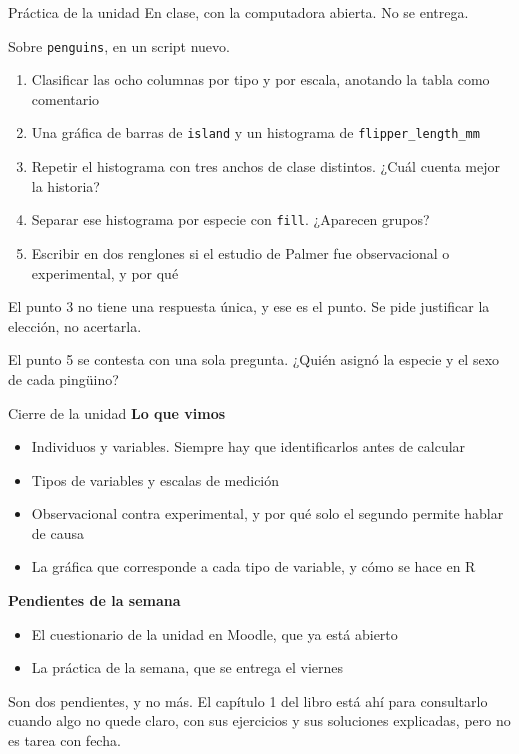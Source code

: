 \documentclass[aspectratio=169,10pt]{beamer}
\newcommand{\Rc}[1]{{\setlength{\fboxsep}{1.6pt}%
  \colorbox{codigoFondo}{\textcolor{codigoTexto}{\texttt{#1}}}}}
\newcommand{\destaca}[1]{%
  \par\vspace{3pt}\noindent
  \colorbox{azulClaro}{%
    \parbox{\dimexpr\linewidth-2\fboxsep\relax}{\vspace{3pt}#1\vspace{3pt}}}%
  \par\vspace{3pt}}
\begin{document}
\begin{frame}[fragile]{Práctica de la unidad}
  {\small\color{grisT} En clase, con la computadora abierta. No se entrega.}

  \vspace{0.2cm}
  Sobre \texttt{penguins}, en un script nuevo.

  \vspace{0.25cm}
  \begin{enumerate}
    \item Clasificar las ocho columnas por tipo y por escala, anotando la tabla como comentario
    \item Una gráfica de barras de \Rc{island} y un histograma de \Rc{flipper\_length\_mm}
    \item Repetir el histograma con tres anchos de clase distintos. ¿Cuál cuenta mejor la historia?
    \item Separar ese histograma por especie con \Rc{fill}. ¿Aparecen grupos?
    \item Escribir en dos renglones si el estudio de Palmer fue observacional o experimental, y por qué
  \end{enumerate}

  \vspace{0.3cm}
  \destaca{\small El punto 3 no tiene una respuesta única, y ese es el punto. Se pide
  justificar la elección, no acertarla.

  \vspace{0.15cm}
  El punto 5 se contesta con una sola pregunta. ¿Quién asignó la especie y el sexo de
  cada pingüino?}
\end{frame}
\begin{frame}{Cierre de la unidad}
  \textbf{Lo que vimos}
  \begin{itemize}
    \item Individuos y variables. Siempre hay que identificarlos antes de calcular
    \item Tipos de variables y escalas de medición
    \item Observacional contra experimental, y por qué solo el segundo permite hablar de causa
    \item La gráfica que corresponde a cada tipo de variable, y cómo se hace en R
  \end{itemize}

  \vspace{0.4cm}
  \textbf{Pendientes de la semana}
  \begin{itemize}
    \item El cuestionario de la unidad en Moodle, que ya está abierto
    \item La práctica de la semana, que se entrega el viernes
  \end{itemize}

  \vspace{0.5cm}
  \destaca{\small Son dos pendientes, y no más. El capítulo 1 del libro está ahí para
  consultarlo cuando algo no quede claro, con sus ejercicios y sus soluciones
  explicadas, pero no es tarea con fecha.}
\end{frame}
\end{document}
